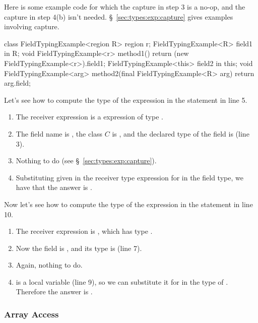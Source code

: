 Here is some example code for which the capture in step 3 is a no-op,
and the capture in step 4(b) isn't needed.
\S~\ref{sec:types:exp:capture} gives examples involving capture.
%
\begin{numbereddpjlisting}
class FieldTypingExample<region R> {
  region r;
  FieldTypingExample<R> field1 in R;
  void FieldTypingExample<r> method1() {
    return (new FieldTypingExample<r>).field1;
  }        
  FieldTypingExample<this> field2 in this;
  void FieldTypingExample<arg> 
  method2(final FieldTypingExample<R> arg) {
    return arg.field;
  }
}
\end{numbereddpjlisting}
%

Let's see how to compute the type of the expression in the
 statement in line 5.  
%
\begin{enumerate}
%
\item The receiver expression is a  expression of type
  .
%
\item The field name is , the class $C$ is
  , and the declared type of the field is
   (line 3).
%
\item Nothing to do (see \S~\ref{sec:types:exp:capture}).  
%
\item Substituting  given in the receiver type
  expression for  in the field type, we have that the answer is
  .
%
\end{enumerate} 

Now let's see how to compute the type of the expression in the
 statement in line 10.  
%
\begin{enumerate}
%
\item The receiver expression is , which has type
  .  
%
\item Now the field is , and its type is
   (line 7).
%
\item Again, nothing to do.
%
\item {} is a  local variable (line 9), so we can
  substitute it for  in the type of .  Therefore
  the answer is .
%
\end{enumerate}

\subsubsection{Array Access%
\label{sec:types:exp:array}}

